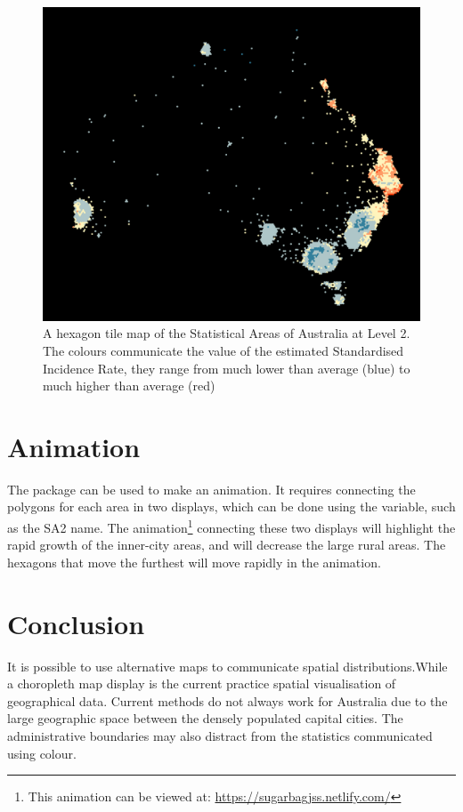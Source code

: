 \documentclass[
]{jss}
\begin{document}
\begin{figure}

{\centering \includegraphics[width=0.6\linewidth]{figures/aus_melanoma_p_hex} 

}

\caption[A hexagon tile map of the Statistical Areas of Australia at Level 2]{A hexagon tile map of the Statistical Areas of Australia at Level 2. The colours communicate the value of the estimated Standardised Incidence Rate, they range from much lower than average (blue) to much higher than average (red)}\label{fig:melanoma-hex}
\end{figure}

\hypertarget{animation}{%
\section{Animation}\label{animation}}

The  package can be used to make an animation. It
requires connecting the polygons for each area in two displays, which
can be done using the  variable, such as the SA2 name. The
animation\footnote{This animation can be viewed at:
  \url{https://sugarbagjss.netlify.com/}} connecting these two displays
will highlight the rapid growth of the inner-city areas, and will
decrease the large rural areas. The hexagons that move the furthest will
move rapidly in the animation.

\hypertarget{conclusion}{%
\section{Conclusion}\label{conclusion}}

It is possible to use alternative maps to communicate spatial
distributions.While a choropleth map display is the current practice
spatial visualisation of geographical data. Current methods do not
always work for Australia due to the large geographic space between the
densely populated capital cities. The administrative boundaries may also
distract from the statistics communicated using colour.
\end{document}
